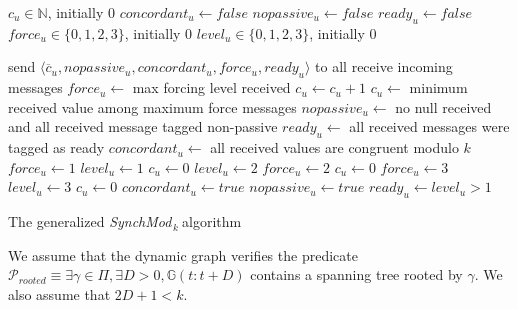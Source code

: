\documentclass[11pt,letterpaper]{article}
\newcommand{\cent}{\gamma}
\newcommand{\SM}{{\em SynchMod}$_{\,k}\ $}
\begin{document}
\begin{algorithm}[htb]\label{algo:code}
\begin{distribalgo}[1]
\BLANK {}
	\STATE $c_u \in \mathds{N}$, initially 0
	\STATE $concordant_u \leftarrow false$
	\STATE $nopassive_u \leftarrow false$
	\STATE $ready_u \leftarrow false$
	\STATE $force_u \in \{0, 1, 2, 3\}$, initially 0
	\STATE $level_u \in \{0, 1, 2, 3\}$, initially 0

\ENDINDENT \BLANK

	\STATE send $\langle \overline{c}_u, nopassive_u, concordant_u, force_u, ready_u \rangle$ to all 
	\STATE receive incoming messages
	\STATE $force_u \leftarrow$ max forcing level received \label{line:force}
		\STATE $c_u \leftarrow c_u+1$ \label{line:straight-increment}
	\ELSE
		\STATE $c_u \leftarrow$ minimum received value among maximum force messages \label{line:min-z-end}
	\ENDIF
	\STATE $nopassive_u \leftarrow$ no null received and all received message tagged non-passive
	\STATE $ready_u \leftarrow$ all received messages were tagged as ready
	\STATE $concordant_u \leftarrow$ all received values are congruent modulo $k$ \label{line:conc-gossip}
			\STATE $force_u \leftarrow 1$
			\STATE $level_u \leftarrow 1$
			\STATE $c_u \leftarrow 0$
		\ENDIF
			\STATE $level_u \leftarrow 2$
			\STATE $force_u \leftarrow 2$ \label{line:force2}
			\STATE $c_u \leftarrow 0$
		\ENDIF
			\STATE $force_u \leftarrow 3$
			\STATE $level_u \leftarrow 3$
			\STATE $c_u \leftarrow 0$
		\ENDIF
		\STATE $concordant_u \leftarrow true$ \label{line:conc-true}
		\STATE $nopassive_u \leftarrow true$ \label{line:nopassive-true}
		\STATE $ready_u \leftarrow level_u > 1$ \label{line:init-ready}
	\ENDIF
\ENDINDENT 

\caption{The generalized \SM algorithm} \label{algo:R}
\end{distribalgo}

\end{algorithm}

We assume that the dynamic graph verifies the predicate $\mathcal{P}_{rooted} \equiv \exists \cent \in \Pi, \exists D > 0, \mathds{G}(t:t+D)$ contains a spanning tree rooted by $\cent$.
We also assume that $2D+1 < k$.
\end{document}
